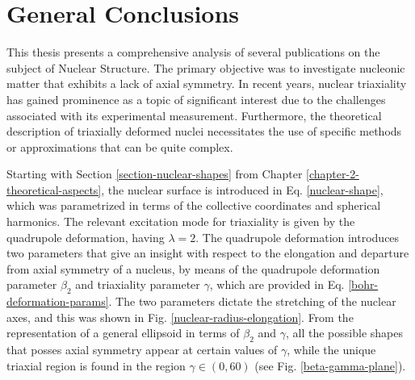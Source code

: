 \chapter{General Conclusions}
\label{chapter-8-conclusions}

This thesis presents a comprehensive analysis of several publications on the subject of Nuclear Structure. The primary objective was to investigate nucleonic matter that exhibits a lack of axial symmetry. In recent years, nuclear triaxiality has gained prominence as a topic of significant interest due to the challenges associated with its experimental measurement. Furthermore, the theoretical description of triaxially deformed nuclei necessitates the use of specific methods or approximations that can be quite complex.


Starting with Section \ref{section-nuclear-shapes} from Chapter \ref{chapter-2-theoretical-aspects}, the nuclear surface is introduced in Eq. \eqref{nuclear-shape}, which was parametrized in terms of the collective coordinates and spherical harmonics. The relevant excitation mode for triaxiality is given by the quadrupole deformation, having $\lambda=2$. The quadrupole deformation introduces two parameters that give an insight with respect to the elongation and departure from axial symmetry of a nucleus, by means of the quadrupole deformation parameter $\beta_2$ and triaxiality parameter $\gamma$, which are provided in Eq. \eqref{bohr-deformation-params}. The two parameters dictate the stretching of the nuclear axes, and this was shown in Fig. \ref{nuclear-radius-elongation}. From the representation of a general ellipsoid in terms of $\beta_2$ and $\gamma$, all the possible shapes that posses axial symmetry appear at certain values of $\gamma$, while the unique triaxial region is found in the region $\gamma\in(0,60)$ (see Fig. \ref{beta-gamma-plane}).

